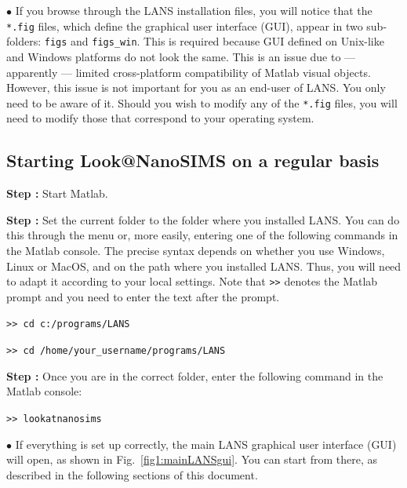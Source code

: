 \documentclass[a4paper, 11pt]{article}
\newcommand{\ttt}[1]{\texttt{#1}}
\newcounter{step}
\newcommand\s{\addtocounter{step}{1}\vskip5pt\noindent\textbf{Step \thestep:}{ }}
\newcommand\bul{\vskip5pt\noindent$\bullet${ }}
\begin{document}
\bul
If you browse through the LANS installation files, you will notice that the \ttt{*.fig} files, which define the graphical user interface (GUI), appear in two sub-folders: \ttt{figs} and \ttt{figs\_win}. This is required because GUI defined on Unix-like and Windows platforms do not look the same. This is an issue due to --- apparently --- limited cross-platform compatibility of Matlab visual objects. However, this issue is not important for you as an end-user of LANS. You only need to be aware of it. Should you wish to modify any of the \ttt{*.fig} files, you will need to modify those that correspond to your operating system.


\subsection{Starting Look@NanoSIMS on a regular basis}
\setcounter{step}{0}

\s Start Matlab.

\s Set the current folder to the folder where you installed LANS. You can do this through the menu or, more easily, entering one of the following commands in the Matlab console. The precise syntax depends on whether you use Windows, Linux or MacOS, and on the path where you installed LANS. Thus, you will need to adapt it according to your local settings. Note that \ttt{>>} denotes the Matlab prompt and you need to enter the text after the prompt.

\ttt{>> cd c:/programs/LANS}

\ttt{>> cd /home/your\_username/programs/LANS}

\s Once you are in the correct folder, enter the following command in the Matlab console:

\ttt{>> lookatnanosims}

\bul If everything is set up correctly, the main LANS graphical user interface (GUI) will open, as shown in Fig.~\ref{fig1:mainLANSgui}. You can start from there, as described in the following sections of this document. 
\end{document}
